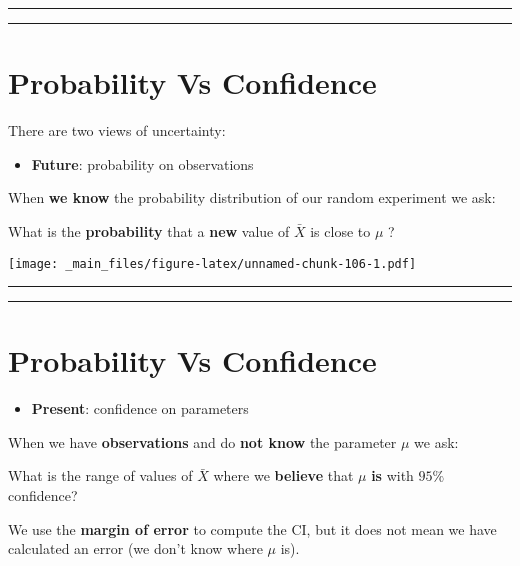 \documentclass[
]{book}
\providecommand{\tightlist}{%
  \setlength{\itemsep}{0pt}\setlength{\parskip}{0pt}}
\begin{document}
\begin{center}\rule{0.5\linewidth}{0.5pt}\end{center}

\begin{center}\rule{0.5\linewidth}{0.5pt}\end{center}

\hypertarget{probability-vs-confidence}{%
\section{Probability Vs Confidence}\label{probability-vs-confidence}}

There are two views of uncertainty:

\begin{itemize}
\tightlist
\item
  \textbf{Future}: probability on observations
\end{itemize}

When \textbf{we know} the probability distribution of our random experiment we ask:

What is the \textbf{probability} that a \textbf{new} value of \(\bar{X}\) is close to \(\mu\) ?

\texttt{[image: \_main\_files/figure-latex/unnamed-chunk-106-1.pdf]}

\begin{center}\rule{0.5\linewidth}{0.5pt}\end{center}

\begin{center}\rule{0.5\linewidth}{0.5pt}\end{center}

\hypertarget{probability-vs-confidence-1}{%
\section{Probability Vs Confidence}\label{probability-vs-confidence-1}}

\begin{itemize}
\tightlist
\item
  \textbf{Present}: confidence on parameters
\end{itemize}

When we have \textbf{observations} and do \textbf{not know} the parameter \(\mu\) we ask:

What is the range of values of \(\bar{X}\) where we \textbf{believe} that \(\mu\) \textbf{is} with \(95\%\) confidence?

We use the \textbf{margin of error} to compute the CI, but it does not mean we have calculated an error (we don't know where \(\mu\) is).
\end{document}
